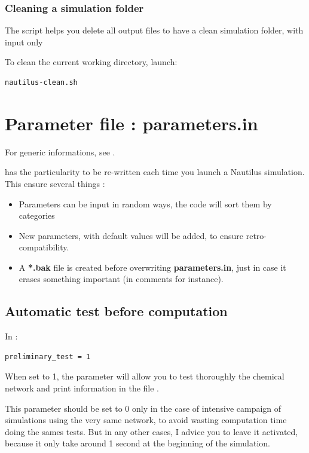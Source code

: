 \documentclass[english,a4paper,twoside]{article}
\begin{document}
\subsubsection{Cleaning a simulation folder}
The script  helps you delete all output files to have a clean simulation folder, with input only

To clean the current working directory, launch:
\begin{verbatim}
nautilus-clean.sh
\end{verbatim}

\section{Parameter file : parameters.in}\label{sec:parameters_in}
For generic informations, see .

 has the particularity to be re-written each time you launch a Nautilus simulation. This ensure several things :
\begin{itemize}
\item Parameters can be input in random ways, the code will sort them by categories
\item New parameters, with default values will be added, to ensure retro-compatibility.
\item A \textbf{*.bak} file is created before overwriting \textbf{parameters.in}, just in case it erases something important (in comments for instance).
\end{itemize}

\subsection{Automatic test before computation}
In : 
\begin{verbatim}
preliminary_test = 1
\end{verbatim}

When set to 1, the parameter  will allow you to test thoroughly the chemical network and print information in the file . 

\begin{remarque}
This parameter should be set to 0 only in the case of intensive campaign of simulations using the very same network, to avoid wasting computation time doing the sames tests. But in any other cases, I advice you to leave it activated, because it only take around 1 second at the beginning of the simulation.
\end{remarque}
\end{document}
